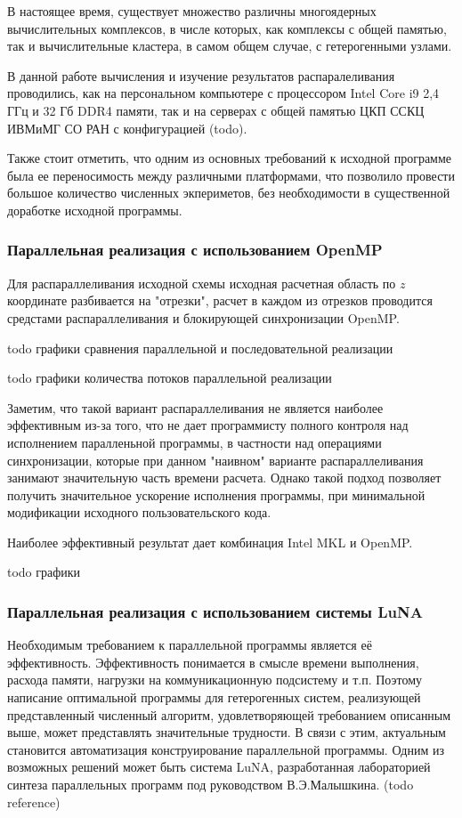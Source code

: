 В настоящее время, существует множество различны многоядерных вычислительных комплексов, в числе которых, как комплексы с общей памятью,
так и вычислительные кластера, в самом общем случае, с гетерогенными узлами.

В данной работе вычисления и изучение результатов распаралеливания проводились, как на персональном компьютере с процессором Intel Core i9 2,4 ГГц и
32 Гб DDR4 памяти, так и на серверах с общей памятью ЦКП ССКЦ ИВМиМГ СО РАН с конфигурацией (todo).

Также стоит отметить, что одним из основных требований к исходной программе была ее переносимость между различными платформами,
что позволило провести большое количество численных экпериметов, без необходимости в существенной доработке исходной программы.

\subsubsection{Параллельная реализация с использованием OpenMP}

Для распараллеливания исходной схемы исходная расчетная область по $z$ координате разбивается на "отрезки",
расчет в каждом из отрезков проводится средстами распараллеливания и блокирующей синхронизации OpenMP.

todo графики сравнения параллельной и последовательной реализации

todo графики количества потоков параллельной реализации

Заметим, что такой вариант распараллеливания не является наиболее эффективным из-за того, что не дает программисту полного контроля
над исполнением паралленьной программы, в частности над операциями синхронизации, которые при данном "наивном" варианте распараллеливания
занимают значительную часть времени расчета. Однако такой подход позволяет получить значительное ускорение исполнения программы,
при минимальной модификации исходного пользовательского кода.

Наиболее эффективный результат дает комбинация Intel MKL и OpenMP.

todo графики

\subsubsection{Параллельная реализация с использованием системы LuNA}

Необходимым требованием к параллельной программы является её эффективность. Эффективность понимается в смысле времени выполнения,
расхода памяти, нагрузки на коммуникационную подсистему и т.п.
Поэтому написание оптимальной программы для гетерогенных систем, реализующей представленный численный алгоритм,
удовлетворяющей требованием описанным выше, может представлять значительные трудности.
В связи с этим, актуальным становится автоматизация конструирование параллельной программы.
Одним из возможных решений может быть система LuNA, разработанная лабораторией синтеза параллельных программ под
руководством В.Э.Малышкина. (todo reference)

